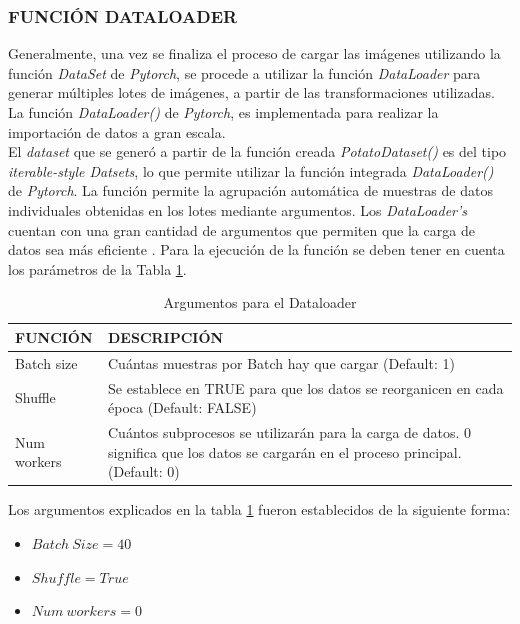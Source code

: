 \subsubsection{FUNCIÓN DATALOADER}			

Generalmente, una vez se finaliza el proceso de cargar las imágenes utilizando la función \textit{DataSet} de \textit{Pytorch}, se procede a utilizar la función \textit{DataLoader} para generar múltiples lotes de imágenes, a partir de las transformaciones utilizadas. La función \textit{DataLoader()} de \textit{Pytorch}, es implementada para realizar la importación de datos a gran escala.\\
 
El \textit{dataset} que se generó a partir de la función creada \textit{PotatoDataset()} es del tipo \textit{iterable-style Datsets}, lo que permite utilizar la función integrada \textit{DataLoader()} de \textit{Pytorch}. La función permite la agrupación automática de muestras de datos individuales obtenidas en los lotes mediante argumentos. Los \textit{DataLoader's} cuentan con una gran cantidad de argumentos que permiten que la carga de datos sea más eficiente \cite{Pytorch}. Para la ejecución de la función se deben tener en cuenta los parámetros de la Tabla \ref{table:Argumentos}.

		
\begin{table}[ht]
	\centering
	\begin{tabular}{|p{2.5cm}|p{11cm}|}
		\hline
		FUNCIÓN & DESCRIPCIÓN \\ 
		\hline
		Batch size & Cuántas muestras por Batch hay que cargar (Default: 1)\\
		\hline
		Shuffle & Se establece en TRUE para que los datos se reorganicen en cada época (Default: FALSE)  \\
		\hline
		Num workers & Cuántos subprocesos se utilizarán para la carga de datos. 0 significa que los datos se cargarán en el proceso principal. (Default: 0)\\
		\hline
	\end{tabular}	
	\caption{Argumentos para el Dataloader}
	\label{table:Argumentos}
\end{table}

Los argumentos explicados en la tabla \ref{table:Argumentos} fueron establecidos de la siguiente forma:

\begin{itemize}
	\item $Batch \ Size = 40$
	\item $Shuffle = True$
	\item $Num \ workers = 0$
\end{itemize}

